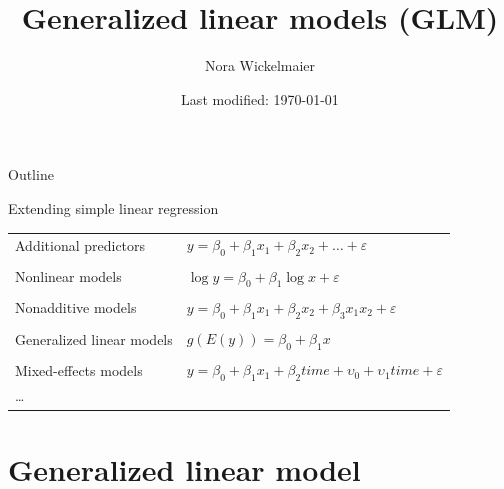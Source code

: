\documentclass[aspectratio=169]{beamer}
\title{Generalized linear models (GLM)}
\author{Nora Wickelmaier}
\date{Last modified: \today}
\begin{document}
\begin{frame}{}
\thispagestyle{empty}
\titlepage
\end{frame}

\begin{frame}{Outline}
\tableofcontents
\end{frame}

\begin{frame}{Extending simple linear regression}
  \begin{tabular}{ll}
    Additional predictors &
      $y = \beta_0 + \beta_1 x_1 + \beta_2 x_2 + \dots +
      \varepsilon$\\
      & \\
    Nonlinear models &
      $\log y = \beta_0 + \beta_1 \log x + \varepsilon$\\
      & \\
    Nonadditive models &
      $y = \beta_0 + \beta_1 x_1 + \beta_2 x_2 + \beta_3
      x_1 x_2 + \varepsilon$\\
      & \\
    Generalized linear models &
      $g(E(y)) = \beta_0 + \beta_1 x$\\
      & \\
    Mixed-effects models &
      $y = \beta_0 + \beta_1 x_1 + \beta_2 time +
      \upsilon_0 + \upsilon_1 time + \varepsilon$\\
      \dots & \\
  \end{tabular}
\end{frame}

\section{Generalized linear model}
\end{document}
